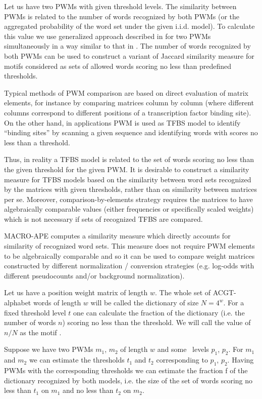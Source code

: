 Let us have two PWMs with given threshold levels. The similarity between PWMs is
related to the number of words recognized by both PWMs
(or the aggregated probability of the word set under the given i.i.d. model).
To calculate this value we use generalized approach
described in \cite{Touzet2007} for two PWMs simultaneously in a way similar to that in \cite{Pape2008}.
The number of words recognized by both PWMs can be used to construct a variant of Jaccard
similarity measure for motifs considered as sets of allowed words scoring no less than predefined thresholds.

Typical methods of PWM comparison are based on direct evaluation of matrix elements, for instance
by comparing matrices column by column (where different columns correspond to different 
positions of a transcription factor binding site).
On the other hand, in applications PWM is used as TFBS model
to identify “binding sites” by scanning a given sequence and identifying words with scores
no less than a threshold.

Thus, in reality a TFBS model is related to the set of words
scoring no less than the given threshold for the given PWM. It is desirable to construct a 
similarity measure for TFBS models based on the similarity between word sets recognized
by the matrices with given thresholds, rather than on  similarity between matrices per
se. Moreover, comparison-by-elements strategy requires the matrices to have algebraically 
comparable values (either frequencies or specifically scaled weights) which is not necessary if 
sets of recognized TFBS are compared.

MACRO-APE computes a similarity measure which directly accounts for similarity of
recognized word sets. This measure does not require PWM elements to be algebraically 
comparable and so it can be used to compare weight matrices constructed by different 
normalization / conversion strategies (e.g. log-odds with different pseudocounts and/or background normalization).

Let us have a position weight matrix of length $w$. The whole set of ACGT-alphabet 
words of length $w$ will be called the dictionary of size $N=4^w$. For a fixed threshold level $t$ one 
can calculate the fraction of the dictionary (i.e. the number of words $n$) scoring no less than the 
threshold. We will call the value of $n / N$ as the motif \pvalue.

Suppose we have two PWMs $m_1$, $m_2$ of length $w$ and some \pvalue\ levels $p_1$, $p_2$. For $m_1$
and $m_2$ we can estimate the thresholds $t_1$ and $t_2$ corresponding to $p_1$, $p_2$. Having PWMs with the 
corresponding thresholds we can estimate the fraction f of the dictionary recognized by both 
models, i.e. the size of the set of words scoring no less than $t_1$ on $m_1$ and no less than $t_2$ on $m_2$.

